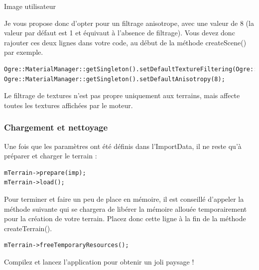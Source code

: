 \documentclass[10pt,a4paper]{report}
\begin{document}
Image utilisateur

Je vous propose donc d'opter pour un filtrage anisotrope, avec une valeur de 8 (la valeur par d\'efaut est 1 et \'equivaut \`a l'absence de filtrage). Vous devez donc rajouter ces deux lignes dans votre code, au d\'ebut de la m\'ethode createScene() par exemple.

\begin{lstlisting}[caption={Choix d'un filtrage anisotrope}]
Ogre::MaterialManager::getSingleton().setDefaultTextureFiltering(Ogre::TFO\_ANISOTROPIC);
Ogre::MaterialManager::getSingleton().setDefaultAnisotropy(8);
\end{lstlisting}

Le filtrage de textures n'est pas propre uniquement aux terrains, mais affecte toutes les textures affich\'ees par le moteur.


\subsubsection{Chargement et nettoyage}


Une fois que les param\`etres ont \'et\'e d\'efinis dans l'ImportData, il ne reste qu'\`a pr\'eparer et charger le terrain :

\begin{lstlisting}[caption={Pr\'eparation et chargement du terrain}]
mTerrain->prepare(imp);
mTerrain->load();
\end{lstlisting}

Pour terminer et faire un peu de place en m\'emoire, il est conseill\'e d'appeler la m\'ethode suivante qui se chargera de lib\'erer la m\'emoire allou\'ee temporairement pour la cr\'eation de votre terrain. Placez donc cette ligne \`a la fin de la m\'ethode createTerrain().

\begin{lstlisting}[caption={Lib\'eration de place en m\'emoire}]
mTerrain->freeTemporaryResources();
\end{lstlisting}

Compilez et lancez l'application pour obtenir un joli paysage !
\end{document}
